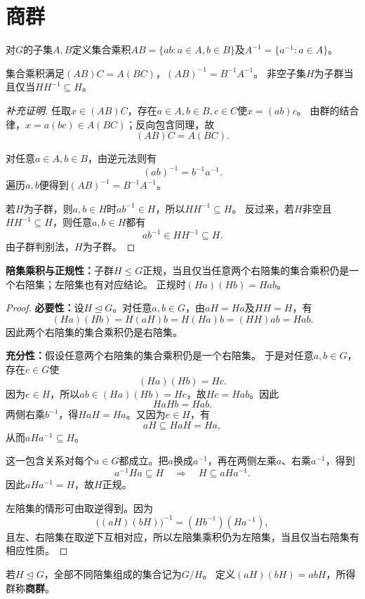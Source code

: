 \section{商群}
\begin{definition}
对$G$的子集$A,B$定义集合乘积$AB=\{ab:a\in A,b\in B\}$及$A^{-1}=\{a^{-1}:a\in A\}$。
\end{definition}
\begin{proposition}
集合乘积满足$(AB)C=A(BC)$，$(AB)^{-1}=B^{-1}A^{-1}$。
非空子集$H$为子群当且仅当$HH^{-1}\subseteq H$。
\end{proposition}
\begin{proof}[补充证明]
任取$x\in(AB)C$，存在$a\in A,b\in B,c\in C$使$x=(ab)c$。
由群的结合律，$x=a(bc)\in A(BC)$；反向包含同理，故
\[
(AB)C=A(BC).
\]

对任意$a\in A,b\in B$，由逆元法则有
\[
(ab)^{-1}=b^{-1}a^{-1}.
\]
遍历$a,b$便得到$(AB)^{-1}=B^{-1}A^{-1}$。

若$H$为子群，则$a,b\in H$时$ab^{-1}\in H$，所以$HH^{-1}\subseteq H$。
反过来，若$H$非空且$HH^{-1}\subseteq H$，则任意$a,b\in H$都有
\[
ab^{-1}\in HH^{-1}\subseteq H.
\]
由子群判别法，$H$为子群。
\end{proof}


\begin{theorem}
\textbf{陪集乘积与正规性：}子群$H\leq G$正规，当且仅当任意两个右陪集的集合乘积仍是一个右陪集；左陪集也有对应结论。
正规时$(Ha)(Hb)=Hab$。
\end{theorem}
\begin{proof}
\textbf{必要性：}设$H\trianglelefteq G$。对任意$a,b\in G$，由$aH=Ha$及$HH=H$，有
\[(Ha)(Hb)=H(aH)b=H(Ha)b=(HH)ab=Hab.\]
因此两个右陪集的集合乘积仍是右陪集。

\textbf{充分性：}假设任意两个右陪集的集合乘积仍是一个右陪集。
于是对任意$a,b\in G$，存在$c\in G$使
\[
(Ha)(Hb)=Hc.
\]
因为$e\in H$，所以$ab\in(Ha)(Hb)=Hc$，故$Hc=Hab$。因此
\[
HaHb=Hab.
\]
两侧右乘$b^{-1}$，得$HaH=Ha$。又因为$e\in H$，有
\[
aH\subseteq HaH=Ha,
\]
从而$aHa^{-1}\subseteq H$。

这一包含关系对每个$a\in G$都成立。把$a$换成$a^{-1}$，再在两侧左乘$a$、右乘$a^{-1}$，得到
\[
a^{-1}Ha\subseteq H
\quad\Longrightarrow\quad
H\subseteq aHa^{-1}.
\]
因此$aHa^{-1}=H$，故$H$正规。

左陪集的情形可由取逆得到。因为
\[
\bigl((aH)(bH)\bigr)^{-1}=(Hb^{-1})(Ha^{-1}),
\]
且左、右陪集在取逆下互相对应，所以左陪集乘积仍为左陪集，当且仅当右陪集有相应性质。
\end{proof}

\begin{definition}
若$H\trianglelefteq G$，全部不同陪集组成的集合记为$G/H$。
定义$(aH)(bH)=abH$，所得群称\textbf{商群}。
\end{definition}

